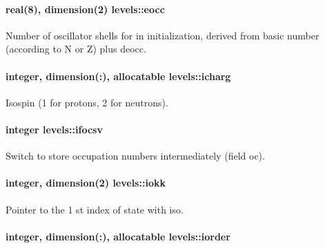 \paragraph[{\texorpdfstring{eocc}{eocc}}]{\setlength{\rightskip}{0pt plus 5cm}real(8), dimension(2) levels\+::eocc}\hypertarget{namespacelevels_a17e702afe8dd8f9a0bad49c50ffcc744}{}\label{namespacelevels_a17e702afe8dd8f9a0bad49c50ffcc744}


Number of oscillator shells for in initialization, derived from basic number (according to N or Z) plus \textquotesingle{}deocc\textquotesingle{}. 

\paragraph[{\texorpdfstring{icharg}{icharg}}]{\setlength{\rightskip}{0pt plus 5cm}integer, dimension(\+:), allocatable levels\+::icharg}\hypertarget{namespacelevels_a6ed487575af304e88ec872c32a7cff19}{}\label{namespacelevels_a6ed487575af304e88ec872c32a7cff19}


Isospin (1 for protons, 2 for neutrons). 

\paragraph[{\texorpdfstring{ifocsv}{ifocsv}}]{\setlength{\rightskip}{0pt plus 5cm}integer levels\+::ifocsv}\hypertarget{namespacelevels_a7f6a832a14f8ccf0a880e041c9d9f166}{}\label{namespacelevels_a7f6a832a14f8ccf0a880e041c9d9f166}


Switch to store occupation numbers intermediately (field \textquotesingle{}oc\textquotesingle{}). 

\paragraph[{\texorpdfstring{iokk}{iokk}}]{\setlength{\rightskip}{0pt plus 5cm}integer, dimension(2) levels\+::iokk}\hypertarget{namespacelevels_a1d09edb9536af05aff0efae9b7871ee1}{}\label{namespacelevels_a1d09edb9536af05aff0efae9b7871ee1}


Pointer to the 1 st index of state with {\ttfamily iso}. 

\paragraph[{\texorpdfstring{iorder}{iorder}}]{\setlength{\rightskip}{0pt plus 5cm}integer, dimension(\+:), allocatable levels\+::iorder}\hypertarget{namespacelevels_a3b749ab6a1c4ad37dad493d3d91d7e04}{}\label{namespacelevels_a3b749ab6a1c4ad37dad493d3d91d7e04}


